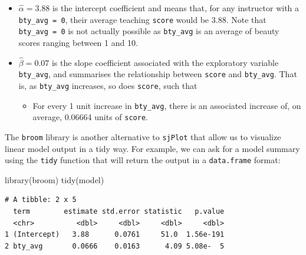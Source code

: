 \documentclass[
  letterpaper,
  DIV=11,
  numbers=noendperiod]{scrartcl}
\newenvironment{Shaded}{\begin{snugshade}}{\end{snugshade}}
\newcommand{\FunctionTok}[1]{\textcolor[rgb]{0.28,0.35,0.67}{#1}}
\newcommand{\NormalTok}[1]{\textcolor[rgb]{0.00,0.23,0.31}{#1}}
\providecommand{\tightlist}{%
  \setlength{\itemsep}{0pt}\setlength{\parskip}{0pt}}\usepackage{longtable,booktabs,array}
\begin{document}
\begin{itemize}
\tightlist
\item
  \(\widehat{\alpha} = 3.88\) is the intercept coefficient and means
  that, for any instructor with a \texttt{bty\_avg\ =\ 0}, their average
  teaching \texttt{score} would be 3.88. Note that
  \texttt{bty\_avg\ =\ 0} is not actually possible as \texttt{bty\_avg}
  is an average of beauty scores ranging between 1 and 10.
\item
  \(\widehat{\beta} = 0.07\) is the slope coefficient associated with
  the exploratory variable \texttt{bty\_avg}, and summarises the
  relationship between \texttt{score} and \texttt{bty\_avg}. That is, as
  \texttt{bty\_avg} increases, so does \texttt{score}, such that

  \begin{itemize}
  \tightlist
  \item
    For every 1 unit increase in \texttt{bty\_avg}, there is an
    associated increase of, on average, 0.06664 units of \texttt{score}.
  \end{itemize}
\end{itemize}

\begin{tcolorbox}[enhanced jigsaw, left=2mm, coltitle=black, breakable, rightrule=.15mm, colbacktitle=quarto-callout-note-color!10!white, opacitybacktitle=0.6, bottomtitle=1mm, colback=white, toptitle=1mm, title=\textcolor{quarto-callout-note-color}{\faInfo}\hspace{0.5em}{Note}, titlerule=0mm, colframe=quarto-callout-note-color-frame, toprule=.15mm, arc=.35mm, opacityback=0, leftrule=.75mm, bottomrule=.15mm]

The \texttt{broom} library is another alternative to \texttt{sjPlot}
that allow us to visualize linear model output in a tidy way. For
example, we can ask for a model summary using the \texttt{tidy} function
that will return the output in a \texttt{data.frame} format:

\begin{Shaded}
\begin{Highlighting}[]
\FunctionTok{library}\NormalTok{(broom)}
\FunctionTok{tidy}\NormalTok{(model)}
\end{Highlighting}
\end{Shaded}

\begin{verbatim}
# A tibble: 2 x 5
  term        estimate std.error statistic   p.value
  <chr>          <dbl>     <dbl>     <dbl>     <dbl>
1 (Intercept)   3.88      0.0761     51.0  1.56e-191
2 bty_avg       0.0666    0.0163      4.09 5.08e-  5
\end{verbatim}

\end{tcolorbox}
\end{document}
